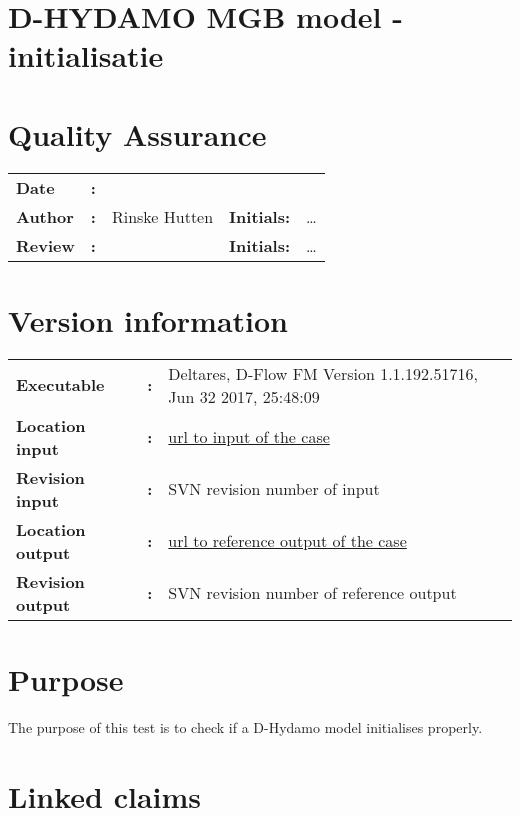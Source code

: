 

\section{D-HYDAMO MGB model -initialisatie }
\newrefsegment

\section*{Quality Assurance}
\begin{tabular}{@{}p{27mm}@{}p{0mm}p{\textwidth-52mm-48pt}p{15mm}p{10mm}}
\textbf{Date} & \textbf{:} &   \\ 
\textbf{Author} & \textbf{:} & Rinske Hutten & \textbf{Initials:} & \ldots \\
\textbf{Review} & \textbf{:} &   & \textbf{Initials:} & \ldots 
\end{tabular}

\section*{Version information}
{{
\begin{tabular}{@{}p{27mm}@{}p{0mm}p{\textwidth-27mm-24pt}}
\textbf{Executable}   & \textbf{:} & Deltares, D-Flow FM Version 1.1.192.51716, Jun 32 2017, 25:48:09  \\
\textbf{Location input}     & \textbf{:} & \url{url to input of the case} \\
\textbf{Revision input} & \textbf{:} & SVN revision number of input \\
\textbf{Location output}     & \textbf{:} & \url{url to reference output of the case} \\
\textbf{Revision output} & \textbf{:} & SVN revision number of reference output
\end{tabular}
}}

\section*{Purpose}
The purpose of this test is to check if a D-Hydamo model initialises properly. 


\section*{Linked claims}

